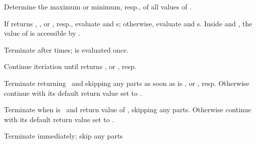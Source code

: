 \begin{LIST}{1cm}
\begin{LIST}{.5cm}
    Determine the maximum or minimum, resp., of all values of
    . 
    
    If  returns \T, \T, or \NIL, resp., evaluate
     and s; otherwise, evaluate 
    and s. Inside  and , the value
    of  is accessible by . 
    
    Terminate  after  times;  is evaluated once.

    Continue iteriation until  returns \NIL, or \T, resp.

    Terminate  returning \NIL\ and skipping any  parts as soon as  is \NIL, or \T, resp. Otherwise continue  with its default return value set to \T.

    Terminate  when  is \T\ and return value of , skipping any  parts. Otherwise continue  with its default return value set to \T.

    Terminate  immediately; skip any  parts
  \end{LIST}
\end{LIST}


